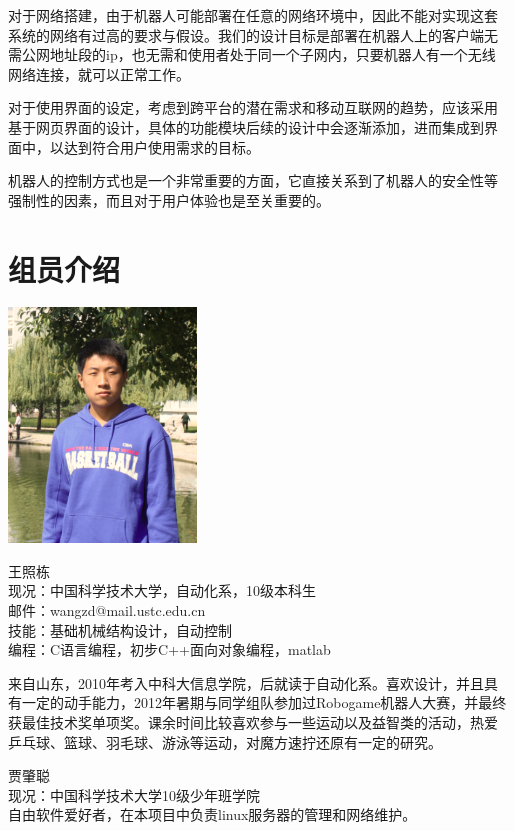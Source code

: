 对于网络搭建，由于机器人可能部署在任意的网络环境中，因此不能对实现这套
系统的网络有过高的要求与假设。我们的设计目标是部署在机器人上的客户端无
需公网地址段的ip，也无需和使用者处于同一个子网内，只要机器人有一个无线
网络连接，就可以正常工作。

对于使用界面的设定，考虑到跨平台的潜在需求和移动互联网的趋势，应该采用
基于网页界面的设计，具体的功能模块后续的设计中会逐渐添加，进而集成到界
面中，以达到符合用户使用需求的目标。

机器人的控制方式也是一个非常重要的方面，它直接关系到了机器人的安全性等
强制性的因素，而且对于用户体验也是至关重要的。

\section{组员介绍}
\label{sec:team}

\begin{framed}
\noindent \includegraphics[width=50mm]{Figures/context.pic.png}
\parbox[b]{0.6\textwidth}{王照栋\\
现况：中国科学技术大学，自动化系，10级本科生\\
邮件：wangzd@mail.ustc.edu.cn\\
技能：基础机械结构设计，自动控制\\
编程：C语言编程，初步C++面向对象编程，matlab\\
}

来自山东，2010年考入中科大信息学院，后就读于自动化系。喜欢设计，并且具
有一定的动手能力，2012年暑期与同学组队参加过Robogame机器人大赛，并最终
获最佳技术奖单项奖。课余时间比较喜欢参与一些运动以及益智类的活动，热爱
乒乓球、篮球、羽毛球、游泳等运动，对魔方速拧还原有一定的研究。
\end{framed}

\begin{framed}
\noindent
{贾肇聪\\
现况：中国科学技术大学10级少年班学院\\
}
自由软件爱好者，在本项目中负责linux服务器的管理和网络维护。
\end{framed}
